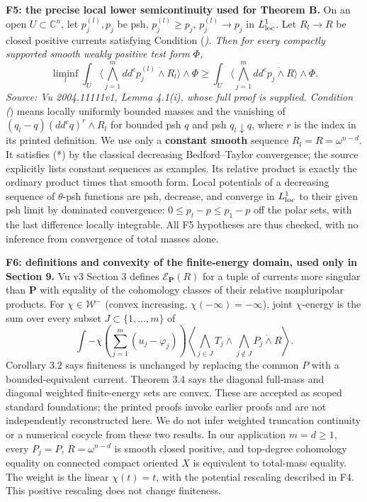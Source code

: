 \documentclass[
  10pt,
]{article}
\begin{document}
\textbf{F5: the precise local lower semicontinuity used for Theorem B.}
On an open \(U\subset\mathbb C^n\), let \(p_j^{(l)},p_j\) be psh,
\(p_j^{(l)}\geq p_j\), \(p_j^{(l)}\to p_j\) in \(L^1_{\rm loc}\). Let
\(R_l\to R\) be closed positive currents satisfying Condition (\emph{).
Then for every compactly supported smooth weakly positive test form
\(\Phi\), \[
\liminf_l\int_U\langle\bigwedge_{j=1}^m dd^cp_j^{(l)}\mathbin{\dot\wedge}R_l\rangle\wedge\Phi
\geq\int_U\langle\bigwedge_{j=1}^m dd^cp_j\mathbin{\dot\wedge}R\rangle\wedge\Phi.
\] Source: Vu 2004.11111v1, Lemma 4.1(i), whose full proof is supplied.
Condition (}) means locally uniformly bounded masses and the vanishing
of \((q_l-q)(dd^cq)^r\wedge R_l\) for bounded psh \(q\) and psh
\(q_l\downarrow q\), where \(r\) is the index in its printed definition.
We use only a \textbf{constant smooth} sequence \(R_l=R=\omega^{n-d}\).
It satisfies (*) by the classical decreasing Bedford--Taylor
convergence; the source explicitly lists constant sequences as examples.
Its relative product is exactly the ordinary product times that smooth
form. Local potentials of a decreasing sequence of \(\theta\)-psh
functions are psh, decrease, and converge in \(L^1_{\rm loc}\) to their
given psh limit by dominated convergence: \(0\leq p_l-p\leq p_1-p\) off
the polar sets, with the last difference locally integrable. All F5
hypotheses are thus checked, with no inference from convergence of total
masses alone.

\textbf{F6: definitions and convexity of the finite-energy domain, used
only in Section 9.} Vu v3 Section 3 defines
\(\mathcal E_{\mathbf P}(R)\) for a tuple of currents more singular than
\(\mathbf P\) with equality of the cohomology classes of their relative
nonpluripolar products. For \(\chi\in\mathcal W^-\) (convex increasing,
\(\chi(-\infty)=-\infty\)), joint \(\chi\)-energy is the sum over every
subset \(J\subset\{1,\ldots,m\}\) of \[
\int -\chi\!\left(\sum_{j=1}^m(u_j-\varphi_j)\right)
\left\langle\bigwedge_{j\in J}T_j\wedge\bigwedge_{j\notin J}P_j\mathbin{\dot\wedge}R\right\rangle.
\] Corollary 3.2 says finiteness is unchanged by replacing the common
\(P\) with a bounded-equivalent current. Theorem 3.4 says the diagonal
full-mass and diagonal weighted finite-energy sets are convex. These are
accepted as scoped standard foundations; the printed proofs invoke
earlier proofs and are not independently reconstructed here. We do not
infer weighted truncation continuity or a numerical cocycle from these
two results. In our application \(m=d\geq1\), every \(P_j=P\),
\(R=\omega^{n-d}\) is smooth closed positive, and top-degree cohomology
equality on connected compact oriented \(X\) is equivalent to total-mass
equality. The weight is the linear \(\chi(t)=t\), with the potential
rescaling described in F4. This positive rescaling does not change
finiteness.
\end{document}
